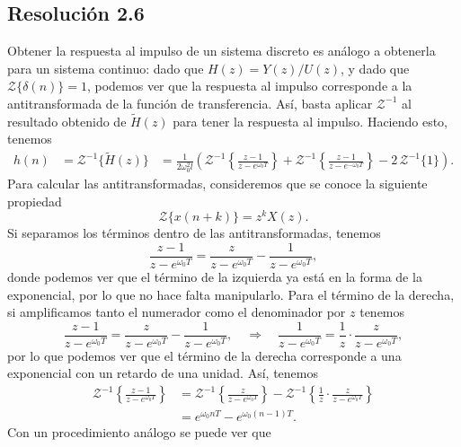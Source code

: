 \documentclass[
  11pt,
  letterpaper,
   addpoints,
  answers
  ]{exam}
\begin{document}
\begin{questions}
\begin{solution}
\subsection*{Resolución 2.6}

Obtener la respuesta al impulso de un sistema discreto es análogo a obtenerla para un sistema continuo: dado que $H(z)=Y(z)/U(z)$, y dado que $\mathcal{Z}\{\delta(n)\}=1$, podemos ver que la respuesta al impulso corresponde a la antitransformada de la función de transferencia. Así, basta aplicar $\mathcal{Z}^{-1}$ al resultado obtenido de $\tilde{H}(z)$ para tener la respuesta al impulso. Haciendo esto, tenemos
\begin{align}
h(n)&=\mathcal{Z}^{-1}\{\tilde{H}(z)\}
&=\frac{1}{2\omega_0^{2} l}\left(
\mathcal{Z}^{-1}\!\left\{\frac{z-1}{z-e^{\omega_0 T}}\right\}
+\mathcal{Z}^{-1}\!\left\{\frac{z-1}{z-e^{-\omega_0 T}}\right\}
-2\,\mathcal{Z}^{-1}\{1\}
\right).
\end{align}
Para calcular las antitransformadas, consideremos que se conoce la siguiente propiedad
\begin{equation}
\mathcal{Z}\{x(n+k)\}=z^{k}X(z).
\end{equation}
Si separamos los términos dentro de las antitransformadas, tenemos
\begin{equation}
\frac{z-1}{z-e^{\omega_0 T}}=\frac{z}{z-e^{\omega_0 T}}-\frac{1}{z-e^{\omega_0 T}},
\end{equation}
donde podemos ver que el término de la izquierda ya está en la forma de la exponencial, por lo que no hace falta manipularlo. Para el término de la derecha, si amplificamos tanto el numerador como el denominador por $z$ tenemos
\begin{equation}
\frac{z-1}{z-e^{\omega_0 T}}=\frac{z}{z-e^{\omega_0 T}}-\frac{1}{z-e^{\omega_0 T}},
\quad\Rightarrow\quad
\frac{1}{z-e^{\omega_0 T}}=\frac{1}{z}\cdot\frac{z}{z-e^{\omega_0 T}},
\end{equation}
por lo que podemos ver que el término de la derecha corresponde a una exponencial con un retardo de una unidad. Así, tenemos
\begin{align}
\mathcal{Z}^{-1}\!\left\{\frac{z-1}{z-e^{\omega_0 T}}\right\}
&=\mathcal{Z}^{-1}\!\left\{\frac{z}{z-e^{\omega_0 T}}\right\}
-\mathcal{Z}^{-1}\!\left\{\frac{1}{z}\cdot\frac{z}{z-e^{\omega_0 T}}\right\}\\
&=e^{\omega_0 nT}-e^{\omega_0 (n-1)T}.
\end{align}
Con un procedimiento análogo se puede ver que
\begin{equation}

\end{equation}
\end{solution}
\end{questions}
\end{document}
